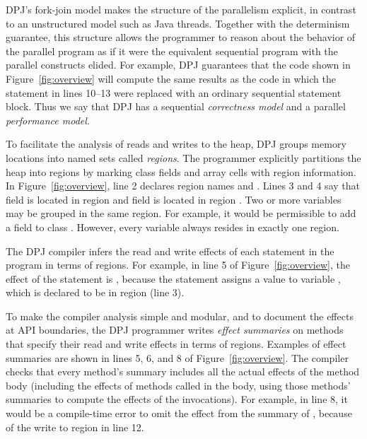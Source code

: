 DPJ's fork-join model makes the structure of the parallelism explicit,
in contrast to an unstructured model such as Java threads.  Together
with the determinism guarantee, this structure allows the programmer
to reason about the behavior of the parallel program as if it were the
equivalent sequential program with the parallel constructs elided.
For example, DPJ guarantees that the code shown in
Figure~\ref{fig:overview} will compute the same results as the code in
which the  statement in lines 10--13 were replaced with
an ordinary sequential statement block.  Thus we say that DPJ has a
sequential \emph{correctness model} and a parallel \emph{performance
  model}.

 To facilitate the analysis of reads and writes to
the heap, DPJ groups memory locations into named sets called
\emph{regions}.  The programmer explicitly partitions the heap into
regions by marking class fields and array cells with region
information.  In Figure~\ref{fig:overview}, line 2 declares region
names  and .  Lines 3 and 4 say that field  is
located in region  and field  is located in region
.  Two or more variables may be grouped in the same region.
For example, it would be permissible to add a field  to class .  However, every variable always resides in
exactly one region.

 The DPJ compiler infers the read and write effects
of each statement in the program in terms of regions.  For example, in
line 5 of Figure~\ref{fig:overview}, the effect of the statement
 is , because the statement assigns a
value to variable , which is declared to be in region 
(line 3).

To make the compiler analysis simple and modular, and to document the
effects at API boundaries, the DPJ programmer writes \emph{effect
  summaries} on methods that specify their read and write effects in
terms of regions.  Examples of effect summaries are shown in lines 5,
6, and 8 of Figure~\ref{fig:overview}.  The compiler checks that every
method's summary includes all the actual effects of the method body
(including the effects of methods called in the body, using those
methods' summaries to compute the effects of the invocations).  For
example, in line 8, it would be a compile-time error to omit the
effect  from the summary of , because of
the write to region  in line 12.

